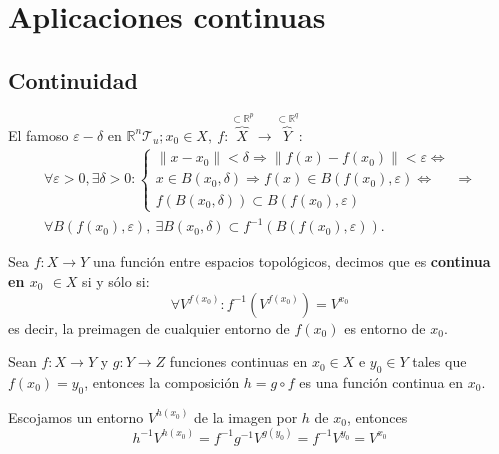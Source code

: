 \chapter{Aplicaciones continuas}%
\label{cha:aplicaciones_continuas}
\section{Continuidad}%
\label{sec:continuidad}
El famoso $\varepsilon-\delta$ en $\mathbb{R}^n \mathcal{T}_u; x_0 \in X,\ f : \overbrace{X}^{\subset \mathbb{R}^p} \rightarrow \overbrace{Y}^{\subset \mathbb{R}^q}$: 
\begin{gather*}        
\forall \varepsilon > 0, \exists \delta > 0: 
\begin{cases}
    \lVert x - x_0 \rVert < \delta \Rightarrow \lVert f\left( x \right) - f\left( x_0 \right) \rVert < \varepsilon \Leftrightarrow\\
    x \in B\left( x_0, \delta \right) \Rightarrow f\left( x \right) \in B\left( f\left( x_0 \right), \varepsilon \right) \Leftrightarrow\\
    f\left( B\left( x_0, \delta \right) \right) \subset B\left( f\left( x_0 \right), \varepsilon \right) 
\end{cases} \Rightarrow\\
\boxed{\forall B\left( f\left( x_0 \right), \varepsilon \right),\ \exists B\left( x_0, \delta \right) \subset f^{-1}\left( B\left( f\left( x_0 \right), \varepsilon \right) \right)} 
.\end{gather*}

\begin{defi}[Continuidad]
Sea $f: X \rightarrow Y$ una función entre espacios topológicos, decimos que es \textbf{continua en $x_0$ $\in X$} si y sólo si:
\[
\forall V^{f\left( x_0 \right)} :  f^{-1}\left( V^{f\left( x_0 \right)} \right) = V^{x_0} 
\]
es decir, la preimagen de cualquier entorno de $f(x_0)$ es entorno de $x_0$.
\end{defi}

\begin{prop}
Sean $f:X \rightarrow Y$ y $g: Y \rightarrow Z$ funciones continuas en $x_0\in X$ e $y_0\in Y$ tales que $f(x_0) = y_0$, entonces la composición $h = g \circ f$ es una función continua en $x_0$.
\end{prop}
\begin{demo}
Escojamos un entorno $V^{h\left( x_0 \right)}$ de la imagen por $h$ de $x_0$, entonces
\[
h^{-1} V^{h\left( x_0 \right)} = f^{-1}g^{-1}V^{g\left( y_0 \right)} = f^{-1} V^{y_0} = V^{x_0}
\]
\end{demo}

